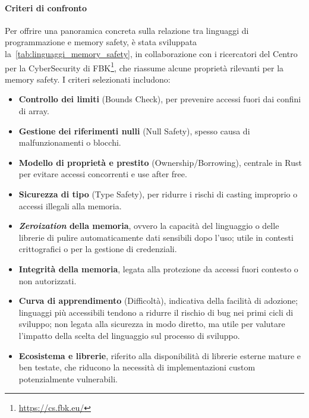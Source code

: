 \paragraph{Criteri di confronto}
Per offrire una panoramica concreta sulla relazione tra linguaggi di
programmazione e memory safety, è stata sviluppata la~\autoref{tab:linguaggi_memory_safety},
in collaborazione con i ricercatori del Centro per la CyberSecurity di FBK\footnote{\url{https://cs.fbk.eu/}},
che riassume alcune proprietà rilevanti per la memory safety. I criteri selezionati
includono:
\begin{itemize}
  \item \textbf{Controllo dei limiti} (Bounds Check), per prevenire accessi fuori
    dai confini di array.

  \item \textbf{Gestione dei riferimenti nulli} (Null Safety), spesso causa di malfunzionamenti
    o blocchi.

  \item \textbf{Modello di proprietà e prestito} (Ownership/Borrowing), centrale
    in Rust per evitare accessi concorrenti e use after free.

  \item \textbf{Sicurezza di tipo} (Type Safety), per ridurre i rischi di casting
    improprio o accessi illegali alla memoria.

  \item \textbf{\textit{Zeroization} della memoria}, ovvero la capacità del linguaggio
    o delle librerie di pulire automaticamente dati sensibili dopo l'uso; utile
    in contesti crittografici o per la gestione di credenziali.

  \item \textbf{Integrità della memoria}, legata alla protezione da accessi fuori
    contesto o non autorizzati.

  \item \textbf{Curva di apprendimento} (Difficoltà), indicativa della facilità di
    adozione; linguaggi più accessibili tendono a ridurre il rischio di bug nei
    primi cicli di sviluppo; non legata alla sicurezza in modo diretto, ma utile
    per valutare l'impatto della scelta del linguaggio sul processo di sviluppo.

  \item \textbf{Ecosistema e librerie}, riferito alla disponibilità di librerie esterne
    mature e ben testate, che riducono la necessità di implementazioni custom
    potenzialmente vulnerabili.
\end{itemize}

